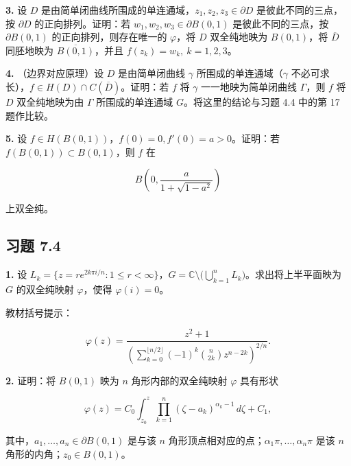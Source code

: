 \documentclass[11pt,a4paper]{article}
\begin{document}
\par{}
\noindent\textbf{3.} 设 \(D\)
是由简单闭曲线所围成的单连通域，\(z_1,z_2,z_3\in\partial D\)
是彼此不同的三点，按 \(\partial D\) 的正向排列。证明：若
\(w_1,w_2,w_3\in\partial B(0,1)\) 是彼此不同的三点，按
\(\partial B(0,1)\) 的正向排列，则存在唯一的 \(\varphi\)，将 \(D\)
双全纯地映为 \(B(0,1)\)，将 \(\overline D\) 同胚地映为
\(\overline{B(0,1)}\)，并且 \(f(z_k)=w_k,\ k=1,2,3\)。

\par{}
\noindent\textbf{4.} （边界对应原理）设 \(D\) 是由简单闭曲线 \(\gamma\)
所围成的单连通域（\(\gamma\)
不必可求长），\(f\in H(D)\cap C(\overline D)\)。证明：若 \(f\) 将
\(\gamma\) 一一地映为简单闭曲线 \(\Gamma\)，则 \(f\) 将 \(D\)
双全纯地映为由 \(\Gamma\) 所围成的单连通域 \(G\)。将这里的结论与习题 4.4
中的第 17 题作比较。

\par{}
\noindent\textbf{5.} 设 \(f\in H(B(0,1))\)，\(f(0)=0,f'(0)=a>0\)。证明：若
\(f(B(0,1))\subset B(0,1)\)，则 \(f\) 在

\[
B\left(0,\frac{a}{1+\sqrt{1-a^2}}\right)
\]

上双全纯。

\subsection{习题 7.4}\label{ch07-practice-heading-5}

\par{}
\noindent\textbf{1.} 设
\(L_k=\{z=re^{2k\pi i/n}:1\le r<\infty\}\)，\(G=\mathbb C\setminus\bigl(\bigcup_{k=1}^nL_k\bigr)\)。求出将上半平面映为
\(G\) 的双全纯映射 \(\varphi\)，使得 \(\varphi(i)=0\)。

教材括号提示：

\[
\varphi(z)=\frac{z^2+1}{\left(\displaystyle\sum_{k=0}^{\lfloor n/2\rfloor}(-1)^k\binom n{2k}z^{n-2k}\right)^{2/n}}.
\]

\par{}
\noindent\textbf{2.} 证明：将 \(B(0,1)\) 映为 \(n\) 角形内部的双全纯映射
\(\varphi\) 具有形状

\[
\varphi(z)=C_0\int_{z_0}^z\prod_{k=1}^n(\zeta-a_k)^{\alpha_k-1}\,d\zeta+C_1,
\]

其中，\(a_1,\ldots,a_n\in\partial B(0,1)\) 是与该 \(n\)
角形顶点相对应的点；\(\alpha_1\pi,\ldots,\alpha_n\pi\) 是该 \(n\)
角形的内角；\(z_0\in B(0,1)\)。
\end{document}
